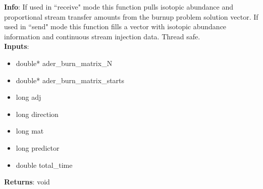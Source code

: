 \textbf{Info}: If used in ``receive" mode this function pulls isotopic abundance
and proportional stream transfer amounts from the burnup problem solution
vector. If used in ``send" mode this function fills a vector with isotopic
abundance information and continuous stream injection data. Thread safe. \\

\noindent \textbf{Inputs}:
\begin{itemize}
\item{double* ader\_burn\_matrix\_N}
\item{double* ader\_burn\_matrix\_starts}
\item{long adj}
\item{long direction}
\item{long mat}
\item{long predictor}
\item{double total\_time}
\end{itemize}

\noindent \textbf{Returns}: void
